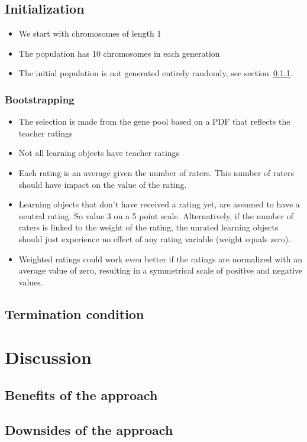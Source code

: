 \subsection{Initialization}
\begin{itemize}
	\item We start with chromosomes of length 1
	\item The population has 10 chromosomes in each generation
	\item The initial population is not generated entirely randomly, see
		section~\ref{sec:approach_bootstrapping}.
\end{itemize}
\subsubsection{Bootstrapping}
\label{sec:approach_bootstrapping}
\begin{itemize}
	\item The selection is made from the gene pool based on a PDF that reflects
		the teacher ratings
	\item Not all learning objects have teacher ratings
	\item Each rating is an average given the number of raters. This number of raters should have impact on the value of the rating.
	\item Learning objects that don't have received a rating yet, are assumed
		to have a neutral rating. So value 3 on a 5 point scale. Alternatively, if the number of raters is linked to the weight of the rating, the unrated learning objects should just experience no effect of any rating variable (weight equals zero).
	\item Weighted ratings could work even better if the ratings are normalized with an average value of zero, resulting in a symmetrical scale of positive and negative values.
\end{itemize}
\subsection{Termination condition}
\section{Discussion}
\subsection{Benefits of the approach}
\subsection{Downsides of the approach}
